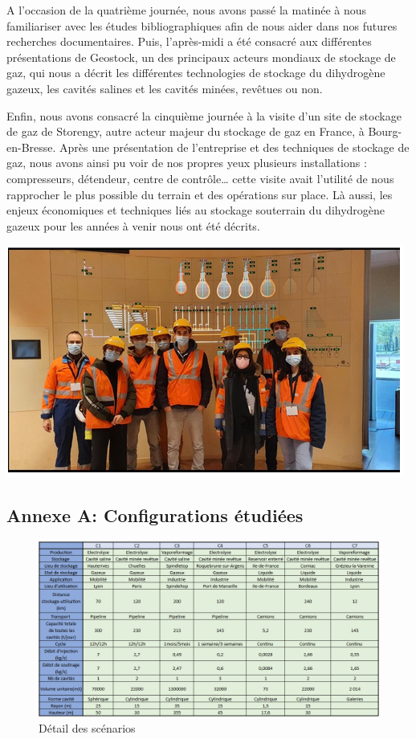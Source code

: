 \documentclass[11pt,french,a4paper]{article}
\begin{document}
A l’occasion de la quatrième journée, nous avons passé la matinée à nous familiariser avec les études bibliographiques afin de nous aider dans nos futures recherches documentaires. Puis, l’après-midi a été consacré aux différentes présentations de Geostock, un des principaux acteurs mondiaux de stockage de gaz, qui nous a décrit les différentes technologies de stockage du dihydrogène gazeux, les cavités salines et les cavités minées, revêtues ou non.

Enfin, nous avons consacré la cinquième journée à la visite d’un site de stockage de gaz de Storengy, autre acteur majeur du stockage de gaz en France, à Bourg-en-Bresse. Après une présentation de l’entreprise et des techniques de stockage de gaz, nous avons ainsi pu voir de nos propres yeux plusieurs installations : compresseurs, détendeur, centre de contrôle… cette visite avait l’utilité de nous rapprocher le plus possible du terrain et des opérations sur place. Là aussi, les enjeux économiques et techniques liés au stockage souterrain du dihydrogène gazeux pour les années à venir nous ont été décrits.
\begin{center}
\includegraphics[width=0.5\linewidth]{image/annexe/tab_bord2.png}
\end{center}

\subsection*{Annexe A: Configurations étudiées} 

\begin{figure}[h]
\centering
\includegraphics[width=0.9\linewidth]{image/annexe/config_cavite_minee/configs.png}
\caption{Détail des scénarios}
\end{figure}
\end{document}

